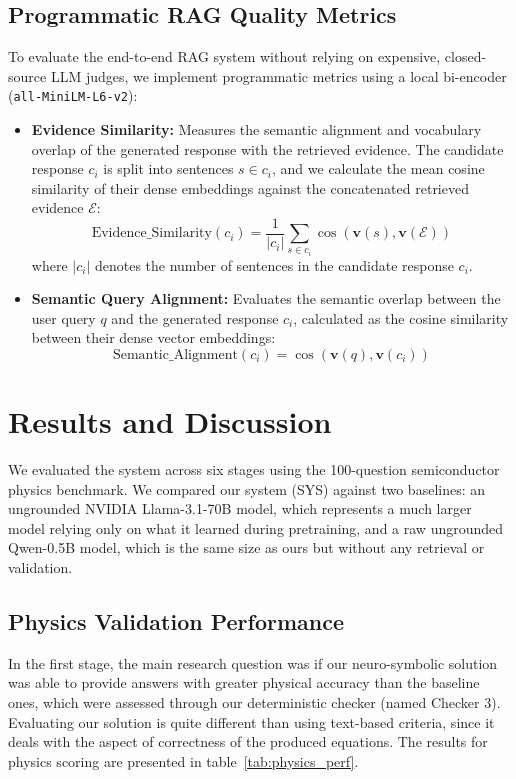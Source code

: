 \documentclass[a4paper,fleqn]{cas-sc}
\begin{document}
\subsection{Programmatic RAG Quality Metrics}
To evaluate the end-to-end RAG system without relying on expensive, closed-source LLM judges, we implement programmatic metrics using a local bi-encoder (\texttt{all-MiniLM-L6-v2}):
\begin{itemize}
    \item \textbf{Evidence Similarity:} Measures the semantic alignment and vocabulary overlap of the generated response with the retrieved evidence. The candidate response $c_i$ is split into sentences $s \in c_i$, and we calculate the mean cosine similarity of their dense embeddings against the concatenated retrieved evidence $\mathcal{E}$:
    \begin{equation*}
        \mathrm{Evidence\_Similarity}(c_i) = \frac{1}{|c_i|}\sum_{s \in c_i} \cos\left( \mathbf{v}(s), \mathbf{v}(\mathcal{E}) \right)
    \end{equation*}
where $|c_i|$ denotes the number of sentences in the candidate response $c_i$.

   \item \textbf{Semantic Query Alignment:} Evaluates the semantic overlap between the user query $q$ and the generated response $c_i$, calculated as the cosine similarity between their dense vector embeddings:
    \begin{equation*}
        \mathrm{Semantic\_Alignment}(c_i) = \cos\left( \mathbf{v}(q), \mathbf{v}(c_i) \right)
    \end{equation*}
\end{itemize}

\FloatBarrier
\section{Results and Discussion}
\label{sec:results}

We evaluated the system across six stages using the 100-question semiconductor physics benchmark. We compared our system (SYS) against two baselines: an ungrounded NVIDIA Llama-3.1-70B model, which represents a much larger model relying only on what it learned during pretraining, and a raw ungrounded Qwen-0.5B model, which is the same size as ours but without any retrieval or validation.

\subsection{Physics Validation Performance}
\label{subsec:overall_physics}
In the first stage, the main research question was if our neuro-symbolic solution was able to provide answers with greater physical accuracy than the baseline ones, which were assessed through our deterministic checker (named Checker 3). Evaluating our solution is quite different than using text-based criteria, since it deals with the aspect of correctness of the produced equations. 
The results for physics scoring are presented in table~\ref{tab:physics_perf}.
\end{document}
